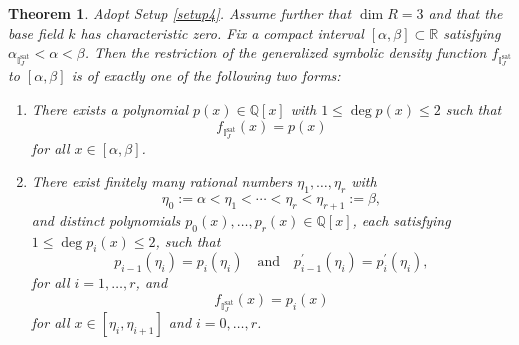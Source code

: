 \documentclass[12pt,a4paper]{amsart}
\theoremstyle{plain}
\newtheorem{theorem}{Theorem}[section]
\theoremstyle{definition}
\numberwithin{equation}{theorem}
\begin{document}
\begin{theorem}\label{dimension_three}
Adopt Setup \ref{setup4}. Assume further that $\dim R=3$ and that the base field $k$ has characteristic zero. Fix a compact interval $[\alpha,\beta]\subset\mathbb{R}$ satisfying
$\alpha_{\mathbb{I}^{\mathrm{sat}}_J}<\alpha<\beta$. Then the restriction of the generalized symbolic density function $f_{\mathbb{I}^{\mathrm{sat}}_J}$ to $[\alpha,\beta]$ is of exactly one of the following two forms:
\begin{enumerate}
\item[$(i)$] There exists a polynomial $p(x)\in\mathbb{Q}[x]$ with $1\leq\deg p(x)\leq 2$ such that $$f_{\mathbb{I}^{\mathrm{sat}}_J}(x)=p(x)$$ for all $x\in [\alpha,\beta]$.
\item[$(ii)$] There exist finitely many rational numbers $\eta_1,\ldots,\eta_r$ with $$\eta_0:=\alpha<\eta_1<\cdots<\eta_r<\eta_{r+1}:=\beta,$$ and distinct polynomials $p_0(x),\ldots,p_r(x)\in\mathbb{Q}[x]$, each satisfying $1\leq\deg p_i(x)\leq 2$, such that $$p_{i-1}(\eta_i)=p_i(\eta_i) \quad\text{and}\quad p^{\prime}_{i-1}(\eta_i)=p^{\prime}_i(\eta_i),$$ for all $i=1,\ldots,r$, and $$f_{\mathbb{I}^{\mathrm{sat}}_J}(x)=p_{i}(x)$$ for all $x\in[\eta_{i},\eta_{i+1}]$ and $i=0,\ldots,r$.
\end{enumerate}
\end{theorem}
\end{document}
